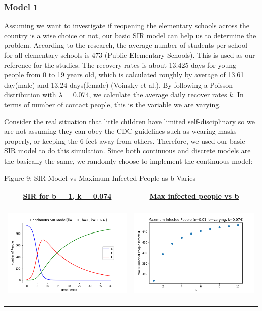 \documentclass[11pt,a4paper]{article}
\begin{document}
\subsubsection*{Model 1}
Assuming we want to investigate if reopening the elementary schools across the country is a wise choice or not, our basic SIR model can help us to determine the problem. According to the research, the average number of students per school for all elementary schools is 473 (Public Elementary Schools). This is used as our reference for the studies. The recovery rates is about 13.425 days for young people from 0 to 19 years old, which is calculated roughly by average of 13.61 day(male) and 13.24 days(female) (Voinsky et al.). By following a Poisson distribution with $\lambda$ = 0.074, we calculate the average daily recover rates $k$. In terms of number of contact people, this is the variable we are varying. 

\medskip \noindent
Consider the real situation that little children have limited self-disciplinary so we are not assuming they can obey the CDC guidelines such as wearing masks properly, or keeping the 6-feet away from others. Therefore, we used our basic SIR model to do this simulation. Since both continuous and discrete models are the basically the same, we randomly choose to implement the continuous model:


  \begin{center}
 	Figure 9: SIR Model vs Maximum Infected People as b Varies
 \end{center}
 \begin{center}
 	
 	\begin{tabular}{c c}
 		\textbf{\underline{SIR for b = 1, k = 0.074}} &
 		\textbf{\underline{Max infected people vs b}} \\
 		\includegraphics[width=7cm, height=5.2cm]{cont_b1.png} & \includegraphics[width=7cm, height=5.2cm]{cont_peak.png}
 	\end{tabular}
 
 \end{center}
  
\end{document}
